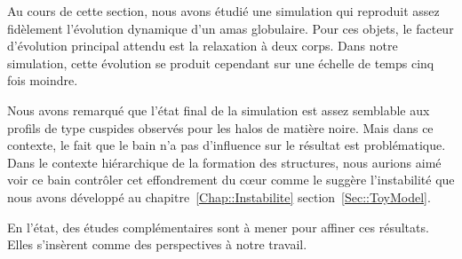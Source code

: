 
		Au cours de cette section, nous avons étudié une simulation qui reproduit assez fidèlement l'évolution dynamique d'un amas globulaire.
		Pour ces objets, le facteur d'évolution principal attendu est la relaxation à deux corps. Dans notre simulation, cette évolution se produit
		cependant sur une échelle de temps cinq fois moindre.

		Nous avons remarqué que l'état final de la simulation est assez semblable aux profils de type cuspides observés pour les halos de
		matière noire. Mais dans ce contexte, le fait que le bain n'a pas d'influence sur le résultat est problématique. Dans le contexte
		hiérarchique de la formation des structures, nous aurions aimé voir ce bain contrôler cet effondrement du cœur comme le suggère
		l'instabilité que nous avons développé au chapitre~\ref{Chap::Instabilite} section~\ref{Sec::ToyModel}.

		En l'état, des études complémentaires sont à mener pour affiner ces résultats. Elles s'insèrent comme des perspectives à notre travail.

